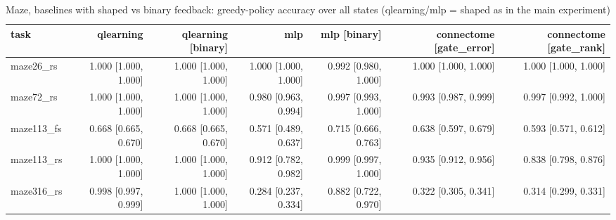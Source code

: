 \begin{table}[t]
\centering
\small
\begin{tabular}{lrrrrrr}
\toprule
task & qlearning & qlearning [binary] & mlp & mlp [binary] & connectome [gate\_error] & connectome [gate\_rank] \\
\midrule
maze26\_rs & 1.000 [1.000, 1.000] & 1.000 [1.000, 1.000] & 1.000 [1.000, 1.000] & 0.992 [0.980, 1.000] & 1.000 [1.000, 1.000] & 1.000 [1.000, 1.000] \\
maze72\_rs & 1.000 [1.000, 1.000] & 1.000 [1.000, 1.000] & 0.980 [0.963, 0.994] & 0.997 [0.993, 1.000] & 0.993 [0.987, 0.999] & 0.997 [0.992, 1.000] \\
maze113\_fs & 0.668 [0.665, 0.670] & 0.668 [0.665, 0.670] & 0.571 [0.489, 0.637] & 0.715 [0.666, 0.763] & 0.638 [0.597, 0.679] & 0.593 [0.571, 0.612] \\
maze113\_rs & 1.000 [1.000, 1.000] & 1.000 [1.000, 1.000] & 0.912 [0.782, 0.982] & 0.999 [0.997, 1.000] & 0.935 [0.912, 0.956] & 0.838 [0.798, 0.876] \\
maze316\_rs & 0.998 [0.997, 0.999] & 1.000 [1.000, 1.000] & 0.284 [0.237, 0.334] & 0.882 [0.722, 0.970] & 0.322 [0.305, 0.341] & 0.314 [0.299, 0.331] \\
\bottomrule
\end{tabular}
\caption{Maze, baselines with shaped vs binary feedback: greedy-policy accuracy over all states (qlearning/mlp = shaped as in the main experiment)}
\label{tab:gridworld_binary_final_policy_acc}
\end{table}